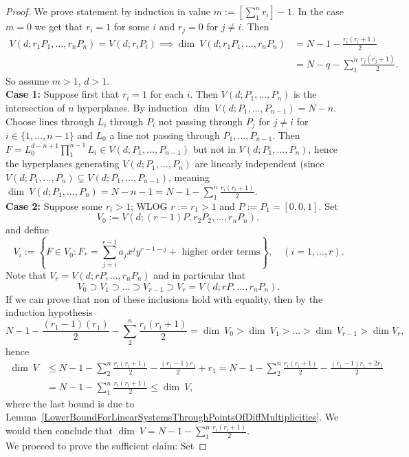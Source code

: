     \begin{proof}
        We prove statement by induction in value $m:=\left[\sum_1^n r_i\right] -1$. In the case $m=0$ we get that $r_i= 1$ for some $i$ and $r_j=0$ for $j\neq i$. Then 
        \begin{align*}
            V(d;r_1P_1,\dots,r_nP_n) = V(d;r_iP_i) \implies \dim \ V(d;r_1P_1,\dots,r_nP_n) &= N-1-\frac{r_i(r_i+1)}{2}\\&= N-q-\sum_1^n \frac{r_j(r_j+1)}{2}.
        \end{align*}
        So assume $m>1$, $d>1$.\\ 
        \textbf{Case 1:} Suppose first that $r_i=1$ for each $i$. Then $V(d;P_1,\dots,P_n)$ is the intersection of $n$ hyperplanes. By induction $\dim\ V(d;P_1,\dots,P_{n-1}) = N-n$. Choose lines through $L_i$ through $P_i$ not passing through $P_j$ for $j\neq i$ for $i\in\{1,\dots,n-1\}$ and $L_0$ a line not passing through $P_1,\dots,P_{n-1}$. Then $F=L_0^{d-n+1}\prod_1^{n-1} L_i\in V(d; P_1,\dots,P_{n-1})$ but not in $V(d;P_1,\dots,P_n)$, hence the hyperplanes generating $V(d;P_1,\dots,P_n)$ are linearly independent (since $V(d;P_1,\dots,P_n)\subsetneq V(d;P_1,\dots,P_{n-1})$, meaning 
        $\dim\ V(d;P_1,\dots,P_n)= N-n-1 = N-1-\sum_1^n \frac{r_i(r_i+1)}{2}.$\\
        \textbf{Case 2:} Suppose some $r_i>1$; WLOG $r:=r_1>1$ and $P:=P_1 = [0,0,1]$. Set 
        $$V_0:=V(d; (r-1)P,r_2P_2,\dots,r_nP_n),$$
        and define 
        $$V_i := \left\{ F \in V_0: F_\ast = \sum_{j=i}^{r-1} a_jx^jy^{r-1-j}+ \text{ higher order terms}\right\},\quad (i=1,\dots,r).$$
        Note that $V_r= V(d;rP,\dots,r_nP_n)$ and in particular that 
        $$V_0\supset V_1\supset \dots\supset V_{r-1}\supset V_r =V(d;rP,\dots, r_nP_n).$$
        If we can prove that non of these inclusions hold with equality, then by the induction hypothesis
        $$N-1-\frac{(r_1-1)(r_1)}{2}-\sum_2^n \frac{r_i(r_i+1)}{2}=\dim\ V_0 > \dim\ V_1 >\dots >\dim \ V_{r-1}>\dim V_r,$$
        hence 
        \begin{align*} 
            \dim \ V &\leq N-1-\sum_2^n \frac{r_i(r_i+1)}{2}- \frac{(r_1-1)r_1}{2}+r_1= N-1-\sum_2^n \frac{r_i(r_i+1)}{2}- \frac{(r_1-1)r_1+2r_1}{2}\\
            &= N-1-\sum_1^n \frac{r_i(r_i+1)}{2} \leq \dim \ V,
        \end{align*}
        where the last bound is due to Lemma~\ref{LowerBoundForLinearSystemsThroughPointsOfDiffMultiplicities}. We would then conclude that $\dim \ V = N-1-\sum_1^n \frac{r_i(r_i+1)}{2}$.\\ We proceed to prove the sufficient claim: Set 

\end{proof}
